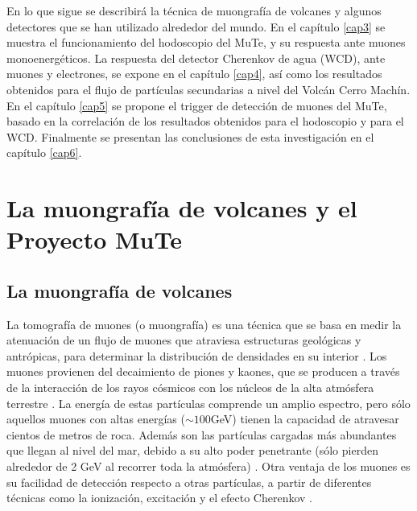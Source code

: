 \documentclass[12pt,oneside,openany,letter]{book}
\begin{document}
En lo que sigue se describirá la técnica de muongrafía de volcanes y algunos detectores que se han utilizado alrededor del mundo. En el capítulo \ref{cap3} se muestra el funcionamiento del hodoscopio del MuTe, y su respuesta ante muones monoenergéticos. La respuesta del detector Cherenkov de agua (WCD), ante muones y electrones, se expone en el capítulo \ref{cap4}, así como los resultados obtenidos para el flujo de partículas secundarias a nivel del Volcán Cerro Machín. En el capítulo \ref{cap5} se propone el trigger de detecci\'on de muones del MuTe, basado en la correlaci\'on de los resultados obtenidos para el hodoscopio y para el WCD. Finalmente se presentan las conclusiones de esta investigación en el capítulo \ref{cap6}.

\chapter{La muongrafía de volcanes y el Proyecto MuTe}\label{cap2}


\section{La muongrafía de volcanes}
La tomografía de muones (o muongrafía) es una t\'ecnica que se basa en medir la atenuación de un flujo de muones que atraviesa estructuras geológicas y antr\'opicas, para determinar la distribuci\'on de densidades en su interior \cite{jourde2013experimental}. Los muones provienen del decaimiento de piones y kaones, que se producen a través de la interacci\'on de los rayos cósmicos con los n\'ucleos de la alta atmósfera terrestre \cite{Grieder2001}. La energ\'ia de estas part\'iculas comprende un amplio espectro, pero s\'olo aquellos muones con altas energías ($\sim 100$GeV) tienen la capacidad de atravesar cientos de metros de roca. Adem\'as son las part\'iculas cargadas m\'as abundantes que llegan al nivel del mar, debido a su alto poder penetrante (s\'olo pierden alrededor de 2 GeV al recorrer toda la atm\'osfera)  \cite{spurio2014particles}. Otra ventaja de los muones es su facilidad de detecci\'on respecto a otras part\'iculas, a partir de diferentes t\'ecnicas como la ionizaci\'on, excitaci\'on y el efecto Cherenkov \cite{Marteau-etal2012}.
\end{document}
